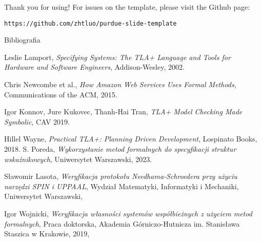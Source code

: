 \documentclass{purdue-poster}
\begin{document}
\begin{frame}{}
\begin{columns}[c]
\begin{column}{.48\linewidth}

    

    \begin{block}{Thank you for using!}
        For issues on the template, please visit the Github page:
        
        {\small\texttt{https://github.com/zhtluo/purdue-slide-template}\par}
    \end{block}

    \begin{block}{\large Bibliografia}
        {\scriptsize 
        \begin{thebibliography}{00}
            Leslie Lamport, \emph{Specifying Systems: The TLA+ Language and Tools for Hardware and Software Engineers}, Addison-Wesley, 2002.
          
            Chris Newcombe et al., \emph{How Amazon Web Services Uses Formal Methods}, Communications of the ACM, 2015.
          
            Igor Konnov, Jure Kukovec, Thanh-Hai Tran, \emph{TLA+ Model Checking Made Symbolic}, CAV 2019.
          
            Hillel Wayne, \emph{Practical TLA+: Planning Driven Development}, Lospinato Books, 2018.
            S. Poreda,
            \textit{Wykorzystanie metod formalnych do specyfikacji struktur wskaźnikowych},
            Uniwersytet Warszawski, 2023.
        
            Sławomir Lasota,
            \textit{Weryfikacja protokołu Needhama-Schroedera przy użyciu narzędzi SPIN i UPPAAL},
            Wydział Matematyki, Informatyki i Mechaniki, Uniwersytet Warszawski,
        
            Igor Wojnicki,
            \textit{Weryfikacja własności systemów współbieżnych z użyciem metod formalnych},
            Praca doktorska, Akademia Górniczo-Hutnicza im. Stanisława Staszica w Krakowie, 2019,


\end{thebibliography}}
\end{block}
\end{column}
\end{columns}
\end{frame}
\end{document}
